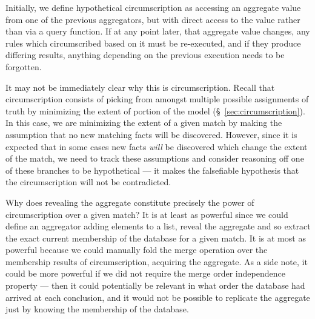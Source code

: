 Initially, we define hypothetical circumscription as accessing an aggregate value from one of the previous aggregators, but with direct access to the value rather than via a query function.
If at any point later, that aggregate value changes, any rules which circumscribed based on it must be re-executed, and if they produce differing results, anything depending on the previous execution needs to be forgotten.

It may not be immediately clear why this is circumscription.
Recall that circumscription consists of picking from amongst multiple possible assignments of truth by minimizing the extent of portion of the model (\S~\ref{sec:circumscription}).
In this case, we are minimizing the extent of a given match by making the assumption that no new matching facts will be discovered.
However, since it is expected that in some cases new facts \emph{will} be discovered which change the extent of the match, we need to track these assumptions and consider reasoning off one of these branches to be hypothetical --- it makes the falsefiable hypothesis that the circumscription will not be contradicted.

Why does revealing the aggregate constitute precisely the power of circumscription over a given match?
It is at least as powerful since we could define an aggregator adding elements to a list, reveal the aggregate and so extract the exact current membership of the database for a given match.
It is at most as powerful because we could manually fold the merge operation over the membership results of circumscription, acquiring the aggregate.
As a side note, it could be more powerful if we did not require the merge order independence property --- then it could potentially be relevant in what order the database had arrived at each conclusion, and it would not be possible to replicate the aggregate just by knowing the membership of the database.

